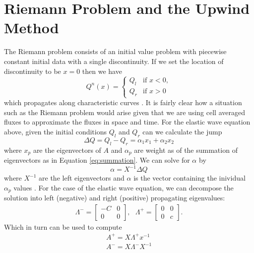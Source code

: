 \documentclass[review,onefignum,onetabnum]{siamart171218}
\begin{document}
\section{Riemann Problem and the Upwind Method}
The Riemann problem consists of an initial value problem with piecewise constant initial data with a single discontinuity. If we set the location of discontinuity to be $x=0$ then we have 
\begin{equation}
Q^n(x) = \begin{cases}
                Q_l & \text{if  } x<0,\\
                Q_r & \text{if  } x>0
        \end{cases}
\end{equation}
which propagates along characteristic curves \cite{leveque_2002}. It is fairly clear how a situation such as the Riemann problem would arise given that we are using cell averaged fluxes to approximate the fluxes in space and time. For the elastic wave equation above, given the initial conditions $Q_l$ and $Q_r$ can we calculate the jump 
\begin{equation}
    \Delta Q = Q_l - Q_r = \alpha_1 x_1  + \alpha_2 x_2
\end{equation}
where $x_p$ are the eigenvectors of $A$ and $\alpha_p$ are weight as of the summation of eigenvectors as in Equation \ref{eq:summation}. We can solve for $\alpha$ by 
\begin{equation}
    \alpha = X^{-1} \Delta Q
\end{equation}
where $X^{-1}$ are the left eigenvectors and $\alpha$ is the vector containing the inividual $\alpha_p$ values \cite{leveque_2002}. For the case of the elastic wave equation, we can decompose the solution into left (negative) and right (positive) propagating eigenvalues:
\begin{align}
    \Lambda^- = \begin{bmatrix} -C & 0 \\ 0 & 0 \end{bmatrix}, \:\:\: \Lambda^+ = \begin{bmatrix} 0 & 0 \\ 0 & c\end{bmatrix}. 
\end{align}
Which in turn can be used to compute 
\begin{equation}
    \begin{gathered}
        A^+ = X \Lambda^+ x^{-1}\\
        A^- = X \Lambda^- X^{-1}
    \end{gathered}
\end{equation}
\end{document}
